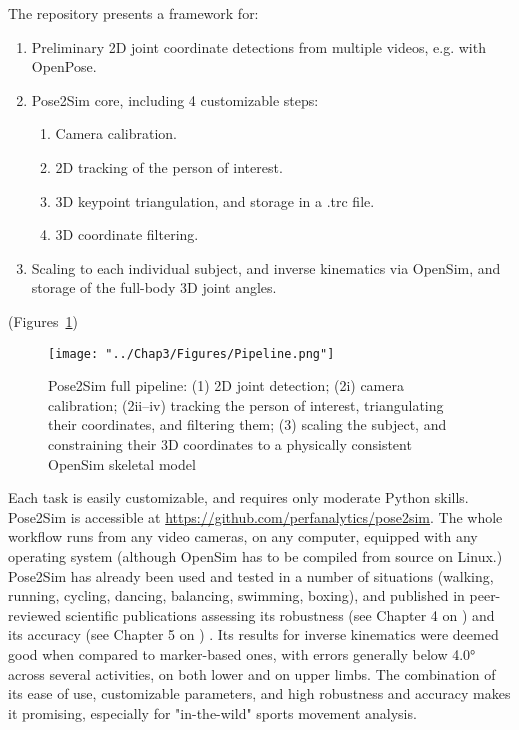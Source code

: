 The repository presents a framework for:
\begin{enumerate}[itemsep=-0.5em, topsep=0pt, leftmargin=*]
      \item Preliminary 2D joint coordinate detections from multiple videos, e.g. with OpenPose.
      \item Pose2Sim core, including 4 customizable steps:
      \begin{enumerate}[before=\vspace{-0.5\baselineskip}, nosep]
            \item Camera calibration.
            \item 2D tracking of the person of interest.
            \item 3D keypoint triangulation, and storage in a .trc file.
            \item 3D coordinate filtering.
      \end{enumerate}
      \item Scaling to each individual subject, and inverse kinematics via OpenSim, and storage of the full-body 3D joint angles.
\end{enumerate}


(Figures~\ref{fig_pipeline})

\begin{figure}[hbtp]
	\centering
	\def\svgwidth{1\columnwidth}
	\fontsize{10pt}{10pt}\selectfont
	\texttt{[image: "../Chap3/Figures/Pipeline.png"]}
	\caption{Pose2Sim full pipeline: (1) 2D joint detection; (2i) camera calibration; (2ii–iv) tracking the person of interest, triangulating their coordinates, and filtering them; (3) scaling the subject, and constraining their 3D coordinates to a physically consistent OpenSim skeletal model}
	\label{fig_pipeline}
\end{figure}
\FloatBarrier

Each task is easily customizable, and requires only moderate Python skills. Pose2Sim is accessible at \url{https://github.com/perfanalytics/pose2sim}. The whole workflow runs from any video cameras, on any computer, equipped with any operating system (although OpenSim has to be compiled from source on Linux.) Pose2Sim has already been used and tested in a number of situations (walking, running, cycling, dancing, balancing, swimming, boxing), and published in peer-reviewed scientific publications assessing its robustness (see Chapter 4 on ) \cite{Pagnon2021} and its accuracy (see Chapter 5 on ) \cite{Pagnon2022}. Its results for inverse kinematics were deemed good when compared to marker-based ones, with errors generally below 4.0° across several activities, on both lower and on upper limbs. The combination of its ease of use, customizable parameters, and high robustness and accuracy makes it promising, especially for "in-the-wild" sports movement analysis.


